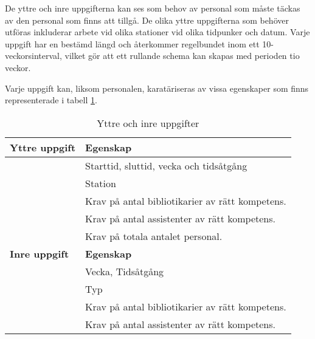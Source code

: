 De yttre och inre uppgifterna kan ses som behov av personal som måste täckas av den personal som finns att tillgå. De olika yttre uppgifterna som behöver utföras inkluderar arbete vid olika stationer vid olika tidpunker och datum. Varje uppgift har en bestämd längd och återkommer regelbundet inom ett 10-veckorsinterval, vilket gör att ett rullande schema kan skapas med perioden tio veckor.  

Varje uppgift kan, liksom personalen, karatäriseras av vissa egenskaper som finns representerade i tabell \ref{int:2}. \\

\begin{table}[!h]
\caption{Yttre och inre uppgifter}
\label{int:2}
\begin{tabular}{|l|l|}
\hline
\textbf{Yttre uppgift} & \textbf{Egenskap} \\ \hline
 & Starttid, sluttid, vecka och tidsåtgång \
\\ \hline 
 & Station
\\ \hline 
 & Krav på antal bibliotikarier av rätt kompetens.
\\ \hline 
 & Krav på antal assistenter av rätt kompetens.
\\ \hline 
 & Krav på totala antalet personal.
\\ \hline 

\textbf{Inre uppgift} & \textbf{Egenskap} \\ \hline
 & Vecka, Tidsåtgång \
\\ \hline 
 & Typ
\\ \hline 
 & Krav på antal bibliotikarier av rätt kompetens.
\\ \hline 
 & Krav på antal assistenter av rätt kompetens.
\\ \hline 
\end{tabular}
\end{table}

